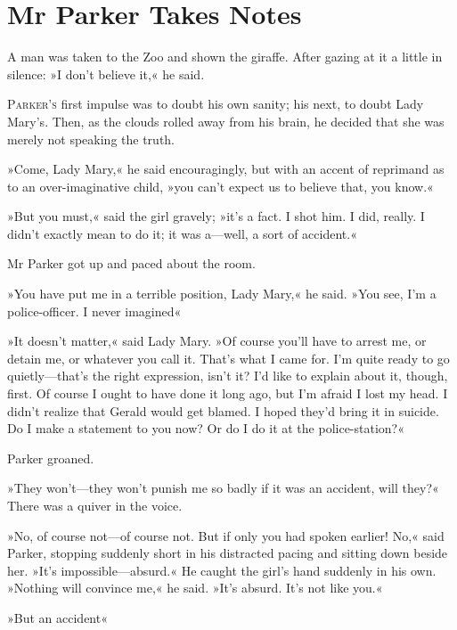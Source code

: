 

\chapter{Mr Parker Takes Notes}

\epigraph{A man was taken to the Zoo and shown the giraffe.  After gazing at it a little in silence: »I don't believe it,« he said.}{}


\lettrine[lines=4]{P}{arker's} first impulse was to doubt his own sanity; his next, to doubt Lady Mary's. Then, as the clouds rolled away from his brain, he decided that she was merely not speaking the truth.

»Come, Lady Mary,« he said encouragingly, but with an accent of reprimand as to an over-imaginative child, »you can't expect us to believe that, you know.«

»But you must,« said the girl gravely; »it's a fact. I shot him. I did, really. I didn't exactly mean to do it; it was a\allowbreak---\allowbreak well, a sort of accident.«

Mr Parker got up and paced about the room.

»You have put me in a terrible position, Lady Mary,« he said. »You see, I'm a police-officer. I never imagined\longdash«

»It doesn't matter,« said Lady Mary. »Of course you'll have to arrest me, or detain me, or whatever you call it. That's what I came for. I'm quite ready to go quietly\allowbreak---\allowbreak that's the right expression, isn't it? I'd like to explain about it, though, first. Of course I ought to have done it long ago, but I'm afraid I lost my head. I didn't realize that Gerald would get blamed. I hoped they'd bring it in suicide. Do I make a statement to you now? Or do I do it at the police-station?«

Parker groaned.

»They won't\allowbreak---\allowbreak they won't punish me so badly if it was an accident, will they?« There was a quiver in the voice.

»No, of course not\allowbreak---\allowbreak of course not. But if only you had spoken earlier!  No,« said Parker, stopping suddenly short in his distracted pacing and sitting down beside her. »It's impossible\allowbreak---\allowbreak absurd.« He caught the girl's hand suddenly in his own. »Nothing will convince me,« he said.  »It's absurd. It's not like you.«

»But an accident\longdash«

